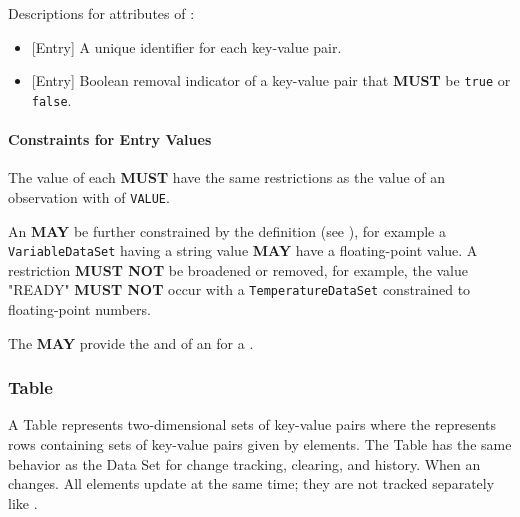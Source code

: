 Descriptions for attributes of :

\begin{itemize}

\item {}[Entry] \newline A unique identifier for each \gls{key-value pair}.

\item {}[Entry] \newline Boolean removal indicator of a \gls{key-value pair} that \textbf{MUST} be \texttt{true} or \texttt{false}.
\end{itemize}

\paragraph{Constraints for Entry Values}\mbox{}
\label{sec:Constraints for Entry Values}

The value of each  \textbf{MUST} have the same restrictions as the value of an \gls{observation} with  of \texttt{VALUE}.

An  \textbf{MAY} be further constrained by the  definition (see ), for example a \texttt{VariableDataSet} having a string value \textbf{MAY} have a floating-point  value. A restriction \textbf{MUST NOT} be broadened or removed, for example, the value "READY" \textbf{MUST NOT} occur with a \texttt{TemperatureDataSet} constrained to floating-point numbers.

The    \textbf{MAY} provide the  and  of an  for a .

\subsubsection{Table}
\label{sec:Table}



A \gls{Table} represents two-dimensional sets of \glspl{key-value pair} where the  represents rows containing sets of \glspl{key-value pair} given by  elements. The \gls{Table} has the same behavior as the \gls{Data Set} for change tracking, clearing, and history. When an  changes. All  elements update at the same time; they are not tracked separately like .

